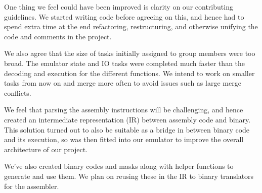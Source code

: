 \documentclass{ictex}
\begin{document}
One thing we feel could have been improved is clarity on our contributing guidelines. We started writing code before agreeing on this, and hence had to spend extra time at the end refactoring, restructuring, and otherwise unifying the code and comments in the project.

We also agree that the size of tasks initially assigned to group members were too broad. The emulator state and IO tasks were completed much faster than the decoding and execution for the different functions. We intend to work on smaller tasks from now on and merge more often to avoid issues such as large merge conflicts.

We feel that parsing the assembly instructions will be challenging, and hence created an intermediate representation (IR) between assembly code and binary. This solution turned out to also be suitable as a bridge in between binary code and its execution, so was then fitted into our emulator to improve the overall architecture of our project.

We've also created binary codes and masks along with helper functions to generate and use them. We plan on reusing these in the IR to binary translators for the assembler.
\end{document}
